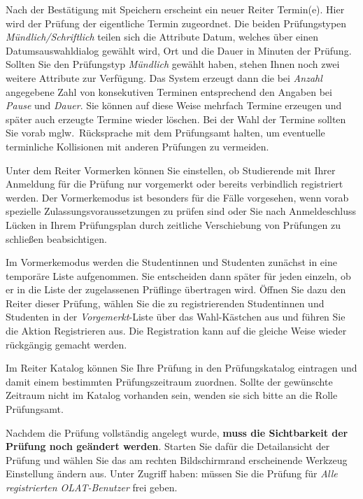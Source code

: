 \documentclass[a4paper,11pt]{article}
\newcommand{\knopf}[1]{{\sc #1}}
\begin{document}
Nach der Bestätigung mit \knopf{Speichern} erscheint ein neuer Reiter
\knopf{Termin(e)}. Hier wird der Prüfung der eigentliche Termin zugeordnet.
Die beiden Prüfungstypen {\em Mündlich/Schriftlich} teilen sich die Attribute
Datum, welches über einen Datumsauswahldialog gewählt wird, Ort und die Dauer
in Minuten der Prüfung. Sollten Sie den Prüfungstyp {\em Mündlich} gewählt
haben, stehen Ihnen noch zwei weitere Attribute zur Verfügung. Das System
erzeugt dann die bei {\em Anzahl} angegebene Zahl von konsekutiven Terminen
entsprechend den Angaben bei {\em Pause} und {\em Dauer}.  Sie können auf
diese Weise mehrfach Termine erzeugen und später auch erzeugte Termine wieder
löschen.  Bei der Wahl der Termine sollten Sie vorab mglw.\ Rücksprache mit
dem Prüfungsamt halten, um eventuelle terminliche Kollisionen mit anderen
Prüfungen zu vermeiden.

Unter dem Reiter \knopf{Vormerken} können Sie einstellen, ob Studierende mit
Ihrer Anmeldung für die Prüfung nur vorgemerkt oder bereits verbindlich
registriert werden.  Der Vormerkemodus ist besonders für die Fälle vorgesehen,
wenn vorab spezielle Zulassungsvoraussetzungen zu prüfen sind oder Sie nach
Anmeldeschluss Lücken in Ihrem Prüfungsplan durch zeitliche Verschiebung von
Prüfungen zu schließen beabsichtigen.  

Im Vormerkemodus werden die Studentinnen und Studenten zunächst in eine temporäre
Liste aufgenommen. Sie entscheiden dann später für jeden einzeln,
ob er in die Liste der zugelassenen Prüflinge übertragen wird.
Öffnen Sie dazu den Reiter dieser Prüfung, wählen Sie die zu registrierenden
Studentinnen und Studenten in der {\em Vorgemerkt}-Liste über das Wahl-Kästchen aus und führen
Sie die Aktion \knopf{Registrieren} aus. Die Registration kann auf die gleiche
Weise wieder rückgängig gemacht werden.

Im Reiter \knopf{Katalog} können Sie Ihre Prüfung in den Prüfungskatalog
eintragen und damit einem bestimmten Prüfungszeitraum zuordnen.  Sollte der
gewünschte Zeitraum nicht im Katalog vorhanden sein, wenden sie sich bitte an
die Rolle Prüfungsamt.

Nachdem die Prüfung vollständig angelegt wurde, {\bf muss die Sichtbarkeit der
  Prüfung noch geändert werden}. Starten Sie dafür die \knopf{Detailansicht}
der Prüfung und wählen Sie das am rechten Bildschirmrand erscheinende Werkzeug
\knopf{Einstellung ändern} aus. Unter \knopf{Zugriff haben:} müssen Sie die
Prüfung für {\em Alle registrierten OLAT-Benutzer} frei geben.  
\end{document}
